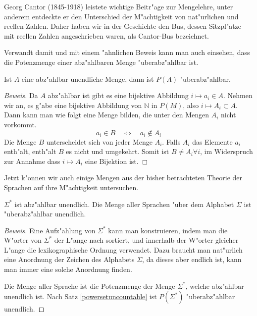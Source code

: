 Georg Cantor (1845-1918) leistete wichtige Beitr"age zur Mengelehre,
unter anderem entdeckte er den Unterschied der M"achtigkeit von
nat"urlichen und reellen Zahlen. Daher haben wir in der Geschichte
den Bus, dessen Sitzpl"atze mit reellen Zahlen angeschrieben waren,
als Cantor-Bus bezeichnet.

Verwandt damit und mit einem "ahnlichen Beweis kann man auch einsehen,
dass die Potenzmenge einer abz"ahlbaren Menge "uberabz"ahlbar ist.

\begin{satz}\label{powersetuncountable}
Ist $A$ eine abz"ahlbar unendliche Menge, dann ist $P(A)$
"uberabz"ahlbar.
\end{satz}

\begin{proof}[Beweis]
Da $A$ abz"ahlbar ist gibt es eine bijektive Abbildung
$i\mapsto a_i\in A$. Nehmen wir an, es g"abe eine bijektive
Abbildung von $\mathbb N$ in $P(M)$, also $i\mapsto A_i\subset A$.
Dann kann man wie folgt eine Menge bilden, die unter den Mengen
$A_i$ nicht vorkommt.
\[
a_i\in B\quad\Leftrightarrow\quad a_i\not\in A_i
\]
Die Menge $B$ unterscheidet sich von jeder Menge $A_i$. Falls
$A_i$ das Elemente $a_i$ enth"alt, enth"alt $B$ es nicht und
umgekehrt. Somit ist $B\ne A_i\forall i$, im Widerspruch zur Annahme
dass $i\mapsto A_i$ eine Bijektion ist.
\end{proof}

Jetzt k"onnen wir auch einige Mengen aus der bisher betrachteten
Theorie der Sprachen auf ihre M"achtigkeit untersuchen.

\begin{satz}
$\Sigma^*$ ist abz"ahlbar unendlich. Die Menge aller Sprachen "uber dem
Alphabet $\Sigma$ ist "uberabz"ahlbar unendlich.
\end{satz}

\begin{proof}[Beweis]
Eine Aufz"ahlung von $\Sigma^*$ kann man konstruieren, indem man
die W"orter von $\Sigma^*$ der L"ange nach sortiert, und innerhalb
der W"orter gleicher L"ange die lexikographische Ordnung verwendet.
Dazu braucht man nat"urlich eine Anordnung der Zeichen des Alphabets $\Sigma$,
da dieses aber endlich ist, kann man immer eine solche Anordnung finden.

Die Menge aller Sprache ist die Potenzmenge der Menge $\Sigma^*$, welche
abz"ahlbar unendlich ist. Nach Satz \ref{powersetuncountable} ist
$P(\Sigma^*)$ "uberabz"ahlbar unendlich.
\end{proof}

